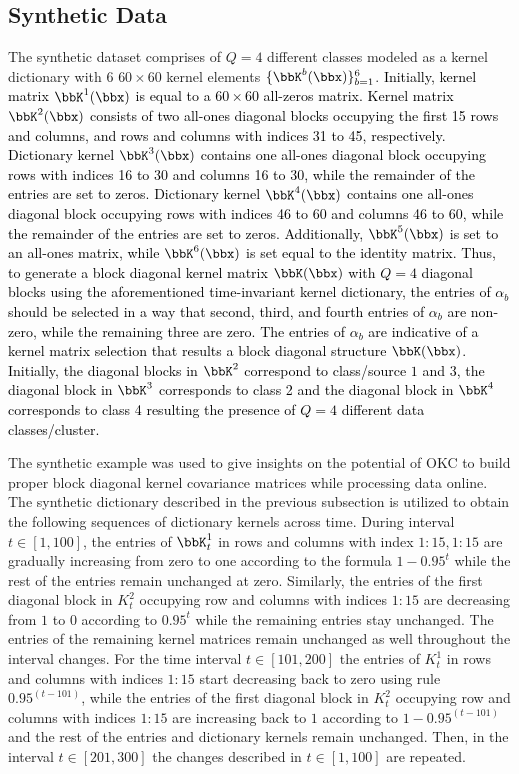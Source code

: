 \documentclass[10pt,final]{IEEEtran}
\begin{document}
\subsection{Synthetic Data}
The synthetic dataset comprises of $Q=4$ different classes modeled as a kernel dictionary with $6$ $60\times 60$ kernel elements $\{\bbK^b(\bbx)\}_{b=1}^6$.
\textcolor{black}{Initially, kernel matrix $\bbK^1(\bbx)$ is equal to a $60\times 60$ all-zeros matrix.}  \textcolor{black}{Kernel matrix $\bbK^2(\bbx)$ consists of two all-ones diagonal blocks occupying the first 15 rows and columns, and rows and columns with indices 31 to 45, respectively.} \textcolor{black}{Dictionary kernel $\bbK^3(\bbx)$ contains one all-ones diagonal block occupying rows with indices 16 to 30 and  columns 16 to 30, while the remainder of the entries are set to zeros. Dictionary kernel $\bbK^4(\bbx)$ contains one all-ones diagonal block occupying rows with indices 46 to 60 and  columns 46 to 60, while the remainder of the entries are set to zeros. Additionally, $\bbK^5(\bbx)$ is set to an all-ones matrix, while $\bbK^6(\bbx)$ is set equal to the identity matrix. Thus, to generate a block diagonal kernel matrix $\bbK(\bbx)$ with $Q=4$ diagonal blocks using the aforementioned time-invariant kernel dictionary, the entries of $\alpha_b$ should be selected in a way that second, third, and fourth entries of $\alpha_b$ are non-zero, while the remaining three are zero. The entries of $\alpha_b$ are indicative of a kernel matrix selection that results a block diagonal structure $\bbK(\bbx)$.} \textcolor{black}{Initially, the diagonal blocks in $\bbK^2$ correspond to class/source $1$ and $3$, the diagonal block in $\bbK^3$ corresponds to class 2 and the diagonal block in $\bbK^4$ corresponds to class 4 resulting the presence of $Q=4$ different data classes/cluster.}

The synthetic example was used to give  insights on the potential of OKC to build proper block diagonal kernel covariance matrices while processing data online. The synthetic dictionary described in the previous subsection is utilized to obtain the following sequences of dictionary kernels across time. During interval $t\in[1,100]$, the entries of $\bbK^1_t$ in rows and columns with index $1:15,1:15$ are gradually increasing from zero to one according to the formula $1-0.95^t$ while the rest of the entries remain unchanged at zero. Similarly,  the entries of the first diagonal block in $K^2_t$ occupying row and columns with indices $1:15$ are decreasing from $1$ to $0$ according to $0.95^t$ while the remaining entries stay unchanged. The entries of the remaining kernel matrices remain unchanged as well throughout the interval changes. For the time interval $t\in[101,200]$ the entries of $K^1_t$ in rows and columns with indices $1:15$ start decreasing back to zero using rule $0.95^{(t-101)}$, while the entries of the first diagonal block in $K^2_t$ occupying row and columns with indices $1:15$ are increasing back to $1$ according to  $1-0.95^{(t-101)}$ and the rest of the entries and dictionary kernels remain unchanged. Then, in the interval $t\in[201,300]$ the changes described in $t\in[1,100]$ are repeated.
\end{document}
